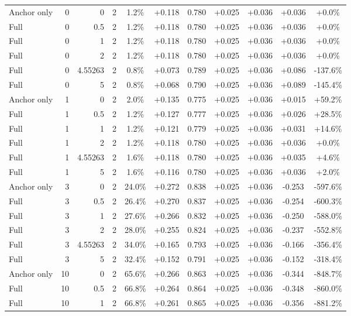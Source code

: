 \begin{table}[htbp]
\begin{tabular}{lrrrccccccc}
Anchor only & 0 & 0 & 2 & 1.2\% & +0.118 & 0.780 & +0.025 & +0.036 & +0.036 & +0.0\% \\
Full & 0 & 0.5 & 2 & 1.2\% & +0.118 & 0.780 & +0.025 & +0.036 & +0.036 & +0.0\% \\
Full & 0 & 1 & 2 & 1.2\% & +0.118 & 0.780 & +0.025 & +0.036 & +0.036 & +0.0\% \\
Full & 0 & 2 & 2 & 1.2\% & +0.118 & 0.780 & +0.025 & +0.036 & +0.036 & +0.0\% \\
Full & 0 & 4.55263 & 2 & 0.8\% & +0.073 & 0.789 & +0.025 & +0.036 & +0.086 & -137.6\% \\
Full & 0 & 5 & 2 & 0.8\% & +0.068 & 0.790 & +0.025 & +0.036 & +0.089 & -145.4\% \\
Anchor only & 1 & 0 & 2 & 2.0\% & +0.135 & 0.775 & +0.025 & +0.036 & +0.015 & +59.2\% \\
Full & 1 & 0.5 & 2 & 1.2\% & +0.127 & 0.777 & +0.025 & +0.036 & +0.026 & +28.5\% \\
Full & 1 & 1 & 2 & 1.2\% & +0.121 & 0.779 & +0.025 & +0.036 & +0.031 & +14.6\% \\
Full & 1 & 2 & 2 & 1.2\% & +0.118 & 0.780 & +0.025 & +0.036 & +0.036 & +0.0\% \\
Full & 1 & 4.55263 & 2 & 1.6\% & +0.118 & 0.780 & +0.025 & +0.036 & +0.035 & +4.6\% \\
Full & 1 & 5 & 2 & 1.6\% & +0.116 & 0.780 & +0.025 & +0.036 & +0.036 & +2.0\% \\
Anchor only & 3 & 0 & 2 & 24.0\% & +0.272 & 0.838 & +0.025 & +0.036 & -0.253 & -597.6\% \\
Full & 3 & 0.5 & 2 & 26.4\% & +0.270 & 0.837 & +0.025 & +0.036 & -0.254 & -600.3\% \\
Full & 3 & 1 & 2 & 27.6\% & +0.266 & 0.832 & +0.025 & +0.036 & -0.250 & -588.0\% \\
Full & 3 & 2 & 2 & 28.0\% & +0.255 & 0.824 & +0.025 & +0.036 & -0.237 & -552.8\% \\
Full & 3 & 4.55263 & 2 & 34.0\% & +0.165 & 0.793 & +0.025 & +0.036 & -0.166 & -356.4\% \\
Full & 3 & 5 & 2 & 32.4\% & +0.152 & 0.791 & +0.025 & +0.036 & -0.152 & -318.4\% \\
Anchor only & 10 & 0 & 2 & 65.6\% & +0.266 & 0.863 & +0.025 & +0.036 & -0.344 & -848.7\% \\
Full & 10 & 0.5 & 2 & 66.8\% & +0.264 & 0.864 & +0.025 & +0.036 & -0.348 & -860.0\% \\
Full & 10 & 1 & 2 & 66.8\% & +0.261 & 0.865 & +0.025 & +0.036 & -0.356 & -881.2\% \\

\end{tabular}
\end{table}

